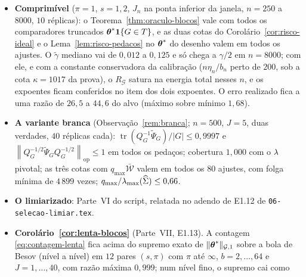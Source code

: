 \documentclass[11pt,a4paper]{article}
\newcommand{\lmin}{\lambda_{\min}}
\newcommand{\lmaxx}{\lambda_{\max}}
\newcommand{\bbeta}{\boldsymbol{\beta}}
\newcommand{\betastar}{\bbeta^{*}}
\newcommand{\gtil}{\widetilde{\gamma}}
\newcommand{\opnorm}[1]{\left\lVert #1 \right\rVert_{\mathrm{op}}}
\newcommand{\bn}{b_{n}}
\newcommand{\nGone}[1]{\lVert #1\rVert_{\mathcal{G},1}}
\newcommand{\Psitil}{\widetilde{\Psi}}
\newcommand{\Rid}{R_{\mathcal{G}}}
\begin{document}
\begin{itemize}[nosep, leftmargin=*]
    $\bar\bbeta = \betastar$ e a do Corolário~\ref{cor:componentes-blocos}
    valem em todos os ajustes, com folga mínima de $3\,999$ vezes;
    $\gtil \ge \lmin(\Gramhat)$ sempre. A razão
    $\normn{\widehat f - f}^{2}/n^{-1/2}$ vai de $9{,}0$ a $10{,}6$ (máximo sobre
    mínimo $1{,}17$), e a inclinação de $\log(\text{erro})$ contra
    $\log n^{-1/2}$ é $1{,}027$, contra $1{,}194$ contra a forma com logaritmo
    $(\log n/n)^{1/2}$ do Teorema~2 de E1.6: o erro realizado segue a taxa sem
    logaritmo, o que E1.6 não conseguia separar. A soma dos erros das
    componentes fica a uma razão de $10{,}7$ a $18{,}7$ do alvo (máximo sobre
    mínimo $1{,}74$), crescendo até $n = 4000$ e estável depois.
  \item \textbf{Comprimível} ($\pi = 1$, $s = 1{,}2$, $J_{n}$ na ponta
    inferior da janela, $n = 250$ a $8000$, $10$ réplicas): o
    Teorema~\ref{thm:oraculo-blocos} vale com todos os comparadores truncados
    $\boldsymbol{\theta}^{*}\mathbf{1}\{G \in T\}$, e as duas cotas do
    Corolário~\ref{cor:risco-ideal} e o Lema~\ref{lem:risco-pedacos} no
    $\boldsymbol{\theta}^{*}$ do desenho valem em todos os ajustes. O $\gtil$ mediano vai
    de $0{,}012$ a $0{,}125$ e só chega a $\gamma/2$ em $n = 8000$; com ele, e
    com a constante conservadora da calibração ($n\eta_{n}/\bn$ perto de
    $200$, sob a cota $\kappa = 1017$ da prova), o $\Rid$ satura na energia
    total nesses $n$, e os expoentes ficam conferidos no item dos dois
    expoentes. O erro realizado fica a uma razão de $26{,}5$ a $44{,}6$ do alvo
    (máximo sobre mínimo $1{,}68$).
  \item \textbf{A variante branca} (Observação~\ref{rem:branca}; $n = 500$,
    $J = 5$, duas verdades, $40$ réplicas cada): $\operatorname{tr}(Q_{G}^{-1}
    \Psitil_{G})/|G| \le 0{,}9997$ e $\opnorm{Q_{G}^{-1/2}\Psitil_{G}
    Q_{G}^{-1/2}} \le 1$ em todos os pedaços; cobertura $1{,}000$ com o $\lambda$
    pivotal; as três cotas com $q_{\max}\bar{\mathcal{W}}$ valem em todos os $80$
    ajustes, com folga mínima de $4\,899$ vezes; $q_{\max}/\lmaxx(\Gramhat) \le
    0{,}66$.
  \item \textbf{O limiarizado}: Parte~VI do script, relatada no adendo de
    E1.12 de \texttt{06-selecao-limiar.tex}.
  \item \textbf{Corolário~\ref{cor:lenta-blocos}} (Parte~VII, E1.13). A
    contagem \eqref{eq:contagem-lenta} fica acima do supremo exato de
    $\nGone{\thetastar}$ sobre a bola de Besov (nível a nível) em $12$ pares
    $(s,\pi)$ com $\pi$ até $\infty$, $b = 2,\dots,64$ e $J = 1,\dots,40$, com
    razão máxima $0{,}999$; num nível fino, o supremo cai como

\end{itemize}
\end{document}
